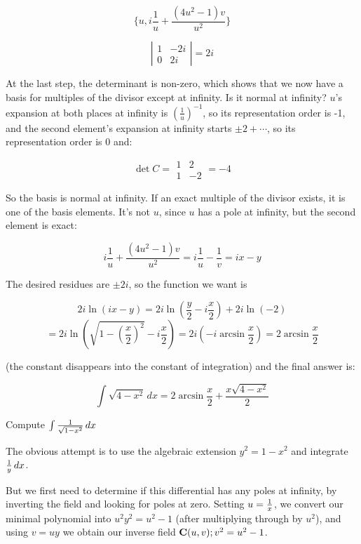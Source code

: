 $$\{u, i\frac{1}{u} + \frac{(4u^2-1)v}{u^2}\}$$

$$\left| \begin{array}{cc} 1 & -2i \\ 0 & 2i \end{array} \right| = 2i$$

At the last step, the determinant is non-zero, which shows that we
now have a basis for multiples of the divisor except at infinity.
Is it normal at infinity?  $u$'s expansion at both places at infinity
is $\left(\frac{1}{u}\right)^{-1}$, so its representation order is -1,
and the second element's expansion at infinity starts $\pm 2 + \cdots$,
so its representation order is 0 and:

$$\det C = \begin{array}{|cc|} 1 & 2 \\ 1 & -2 \end{array} = -4$$

So the basis is normal at infinity.  If an exact multiple of
the divisor exists, it is one of the basis elements.  It's not $u$,
since $u$ has a pole at infinity, but the second element is exact:

$$i\frac{1}{u} + \frac{(4u^2-1)v}{u^2} = i\frac{1}{u} - \frac{1}{v} = ix-y$$

The desired residues are $\pm 2i$, so the function we want is

$$2i \ln(ix-y) = 2i \ln(\frac{y}{2}-i\frac{x}{2}) + 2i \ln(-2) $$
$$= 2i \ln\left(\sqrt{1-\left(\frac{x}{2}\right)^2} - i\frac{x}{2}\right) = 2i (-i \arcsin \frac{x}{2}) = 2 \arcsin \frac{x}{2}$$

(the constant disappears into the constant of integration) and the final answer is:

$$ \int \sqrt{4-x^2} \, dx  = 2\arcsin\frac{x}{2} + \frac{x \sqrt{4-x^2}}{2}$$

\endexample


\vfill\eject
{}

\example Compute $\int {1\over{\sqrt{1-x^2}}} \,dx$

The obvious attempt is to use the algebraic extension $y^2=1-x^2$ and
integrate ${1\over y}\,dx$.

But we first need to determine if this differential has any poles at
infinity, by inverting the field and looking for poles at zero.
Setting $u={1\over x}$, we convert our minimal polynomial into
$u^2y^2=u^2-1$ (after multiplying through by $u^2$), and using
$v=uy$ we obtain our inverse field ${\bf C}(u,v); v^2=u^2-1$.

